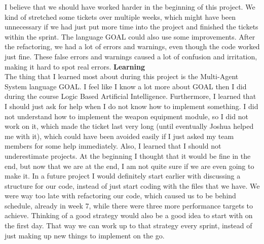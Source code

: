I believe that we should have worked harder in the beginning of this project. We kind of stretched some tickets over multiple weeks, which might have been unnecessary if we had just put more time into the project and finished the tickets within the sprint.
The language GOAL could also use some improvements. After the refactoring, we had a lot of errors and warnings, even though the code worked just fine. These false errors and warnings caused a lot of confusion and irritation, making it hard to spot real errors.
\noindent
\textbf{Learning}\\
The thing that I learned most about during this project is the Multi-Agent System language GOAL. I feel like I know a lot more about GOAL then I did during the course Logic Based Artificial Intelligence.
Furthermore, I learned that I should just ask for help when I do not know how to implement something. I did not understand how to implement the weapon equipment module, so I did not work on it, which made the ticket last very long (until eventually Joshua helped me with it), which could have been avoided easily if I just asked my team members for some help immediately. 
Also, I learned that I should not underestimate projects. At the beginning I thought that it would be fine in the end, but now that we are at the end, I am not quite sure if we are even going to make it.
In a future project I would definitely start earlier with discussing a structure for our code, instead of just start coding with the files that we have. We were way too late with refactoring our code, which caused us to be behind schedule, already in week 7, while there were three more performance targets to achieve. Thinking of a good strategy would also be a good idea to start with on the first day. That way we can work up to that strategy every sprint, instead of just making up new things to implement on the go.
